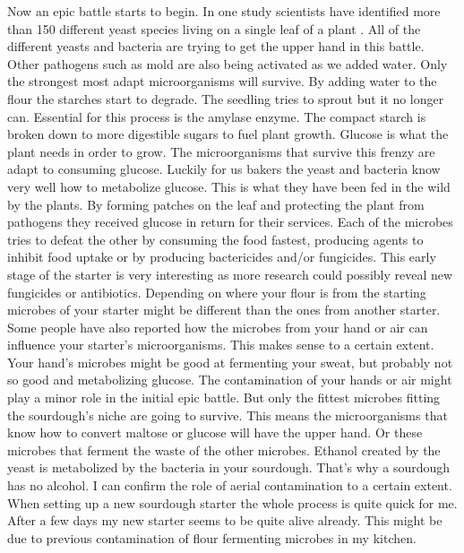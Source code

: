 Now an epic battle starts to begin. In one study scientists
have identified more than 150 different yeast species living
on a single leaf of a plant \cite{yeasts+biocontrol+agent}.
All of the different yeasts and bacteria are trying to get
the upper hand in this battle. Other pathogens such as mold
are also being activated as we added water. Only the strongest
most adapt microorganisms will survive. By adding water to the
flour the starches start to degrade. The seedling tries to
sprout but it no longer can. Essential for this process is the
amylase enzyme. The compact starch is broken down to more
digestible sugars to fuel plant growth. Glucose is what the
plant needs in order to grow. The microorganisms that survive
this frenzy are adapt to consuming glucose. Luckily for us
bakers the yeast and bacteria know very well how to metabolize
glucose. This is what they have been fed in the wild by the plants.
By forming patches on the leaf and protecting the plant from
pathogens they received glucose in return for their services.
Each of the microbes tries to defeat the other by consuming the
food fastest, producing agents to inhibit food uptake or by producing
bactericides and/or fungicides. This early stage of the starter
is very interesting as more research could possibly reveal
new fungicides or antibiotics. Depending on where your flour
is from the starting microbes of your starter might be different
than the ones from another starter. Some people have also reported
how the microbes from your hand or air can influence your starter's
microorganisms. This makes sense to a certain extent. Your
hand's microbes might be good at fermenting your sweat, but
probably not so good and metabolizing glucose. The contamination
of your hands or air might play a minor role in the initial epic
battle. But only the fittest microbes fitting the sourdough's
niche are going to survive. This means the microorganisms that know
how to convert maltose or glucose will have the upper hand. Or these
microbes that ferment the waste of the other microbes. Ethanol created
by the yeast is metabolized by the bacteria in your sourdough. That's
why a sourdough has no alcohol. I can confirm the role of aerial
contamination to a certain extent. When setting up a new sourdough
starter the whole process is quite quick for me. After a few
days my new starter seems to be quite alive already. This might
be due to previous contamination of flour fermenting microbes in
my kitchen.

